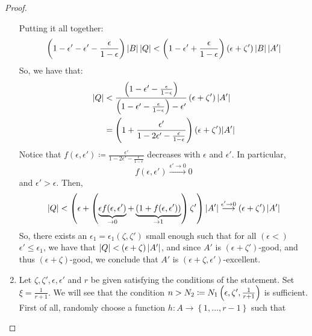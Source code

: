 \begin{proof}
\begin{enumerate}[label=(\alph*), ref=\alph*]
                Putting it all together:
                $$
                    \left( 1 - \epsilon' - \epsilon' - \frac{\epsilon}{1 - \epsilon} \right) \left| B \right| \left| Q \right| <
                    \left( 1 - \epsilon' + \frac{\epsilon}{1 - \epsilon} \right) \left( \epsilon + \zeta' \right) \left| B \right| \left| A' \right|
                $$
                So, we have that:
                \begin{align*}
                    \left| Q \right| & < \frac{\left( 1 - \epsilon' - \frac{\epsilon}{1 - \epsilon} \right)}
                                        {\left( 1 - \epsilon' - \frac{\epsilon}{1 - \epsilon} \right) - \epsilon'}
                                        \left( \epsilon + \zeta' \right) \left| A' \right| \\
                                    & = \left( 1 + \frac{\epsilon'}{1 - 2\epsilon' - \frac{\epsilon}{1 - \epsilon}} \right)
                                        (\epsilon + \zeta') |A'|
                \end{align*}
                Notice that $f(\epsilon, \epsilon') \coloneq \frac{\epsilon'}{1 - 2\epsilon' - \frac{\epsilon}{1 - \epsilon}}$
                decreases with $\epsilon$ and $\epsilon'$.
                In particular,
                $$
                    f(\epsilon, \epsilon') \overset{\epsilon' \to 0}{\longrightarrow} 0
                $$
                and $\epsilon' > \epsilon$.
                Then,
                $$
                    \left| Q \right| < \left( \epsilon + \left( \underbrace{\epsilon f(\epsilon, \epsilon')}_{\to 0} +
                    \underbrace{\left( 1 + f(\epsilon, \epsilon') \right)}_{\to 1} \right) \zeta' \right) |A'|
                    \overset{\epsilon' \to 0}{\longrightarrow} \left( \epsilon + \zeta' \right) |A'|
                $$
                So, there exists an $\epsilon_1 = \epsilon_1(\zeta, \zeta')$ small enough such that for all
                $(\epsilon <)$ $\epsilon' \leq \epsilon_1$, we have that $\left| Q \right| < \left( \epsilon + \zeta \right) |A'|$,
                and since $A'$ is $(\epsilon + \zeta')$-good, and thus $(\epsilon + \zeta)$-good, we conclude that
                $A'$ is $(\epsilon + \zeta, \epsilon')$-excellent.
            \item Let $\zeta, \zeta', \epsilon, \epsilon'$ and $r$ be given satisfying the conditions of the statement.
                Set $\xi = \frac{1}{r + 1}$.
                We will see that the condition $n > N_2 \coloneq N_1\left( \epsilon, \zeta', \frac{1}{r + 1} \right)$ is sufficient.
                First of all, randomly choose a function $h: A \longrightarrow \left\{ 1, \dots, r-1 \right\}$ such that

\end{enumerate}
\end{proof}
